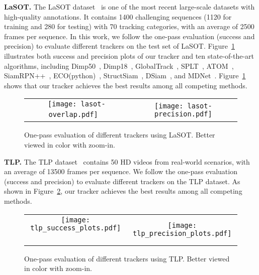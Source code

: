 \documentclass[10pt,twocolumn,letterpaper]{article}
\begin{document}
\noindent \textbf{LaSOT.} The LaSOT dataset~\cite{LaSOT} is one of the most recent large-scale datasets
with high-quality annotations. It contains 1400 challenging sequences (1120 for training and 280 for testing) with
70 tracking categories, with an average of 2500 frames per sequence.
In this work, we follow the one-pass evaluation (success and precision) to evaluate different trackers on the test
set of LaSOT.
Figure~\ref{fig-lasotxx} illustrates both success and precision plots of our tracker and ten state-of-the-art algorithms,
including Dimp50~\cite{Danelljan-ICCV19-DIMP}, Dimp18~\cite{Danelljan-ICCV19-DIMP},
GlobalTrack~\cite{GlobalTrack}, SPLT~\cite{Yan-ICCV19-SPLT},
ATOM~\cite{Danelljan-CVPR19-ATOM}, SiamRPN++~\cite{SiamRPNplus},
ECO(python)~\cite{Danelljan-CVPR17-ECO}, StructSiam~\cite{StructSiam}, DSiam~\cite{DSiam},
and MDNet~\cite{Nam-CVPR16-MDNet}.
Figure~\ref{fig-lasotxx} shows that our tracker achieves the best results among all competing methods.

\begin{figure}[htbp]
\vspace{-3mm}
\begin{center}
\begin{tabular}{c@{}c}
\texttt{[image: lasot-overlap.pdf]} \ &
\texttt{[image: lasot-precision.pdf]} \\
\end{tabular}
\end{center}
\vspace{-5mm}
\caption{One-pass evaluation of different trackers using LaSOT. Better viewed
in color with zoom-in.}
\label{fig-lasotxx}
\vspace{-4mm}
\end{figure}

\noindent \textbf{TLP.} The TLP dataset~\cite{moudgil2018long} contains 50 HD videos from
real-world scenarios, with an average of 13500 frames per sequence.
We follow the one-pass evaluation (success and precision) to evaluate different trackers on the
TLP dataset.
As shown in Figure~\ref{fig-tlp}, our tracker achieves the best results among all competing
methods.

\begin{figure}[htbp]
\vspace{-3mm}
\begin{center}
\begin{tabular}{c@{}c}
\texttt{[image: tlp\_success\_plots.pdf]} \ &
\texttt{[image: tlp\_precision\_plots.pdf]} \\
\end{tabular}
\end{center}
\vspace{-5mm}
\caption{One-pass evaluation of different trackers using TLP. Better viewed
in color with zoom-in.}
\label{fig-tlp}
\vspace{-4mm}
\end{figure}
\end{document}
